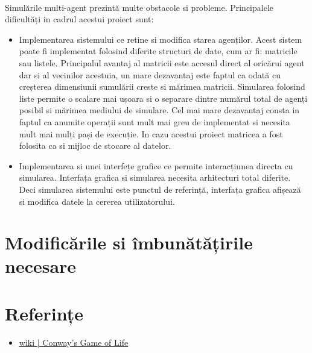 \documentclass[11pt ,A4]{article}
\begin{document}
        \paragraph{} 
            Simulările multi-agent prezintă multe obstacole si probleme.
            Principalele dificultăți in cadrul acestui proiect sunt:
        \begin{itemize}
            \item Implementarea sistemului ce retine si modifica starea agenților.
                Acest sistem poate fi implementat folosind diferite structuri de date, cum ar fi: matricile sau listele.
                Principalul avantaj al matricii este accesul direct al oricărui agent dar si al vecinilor acestuia, un mare dezavantaj este faptul ca odată cu creșterea dimensiunii sumulării creste si mărimea matricii.
                Simularea folosind liste permite o scalare mai ușoara si o separare dintre numărul total de agenți posibil si mărimea mediului de simulare.
                Cel mai mare dezavantaj consta in faptul ca anumite operații sunt mult mai greu de implementat si necesita mult mai mulți pași de execuție.
                In cazu acestui proiect matricea a fost folosita ca si mijloc de stocare al datelor.
            \item Implementarea si unei interfețe grafice ce permite interacțiunea directa cu simularea.
                Interfața grafica si simularea necesita arhitecturi total diferite.
                Deci simularea sistemului este punctul de referință, interfața grafica afișează si modifica datele la cererea utilizatorului.
        \end{itemize}

    \section{Modificările si îmbunătățirile necesare}

    \section{Referințe}

        \begin{itemize}
            \item \href{https://en.wikipedia.org/wiki/Conway%27s_Game_of_Life}{wiki | Conway's Game of Life}
        \end{itemize}
\end{document}
